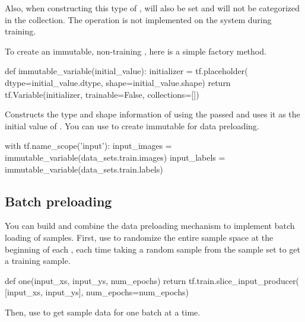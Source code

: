 \begin{content}
Also, when constructing this type of ,  will also be set and will not be categorized in the  collection. The  operation is not implemented on the system during training.

To create an immutable, non-training , here is a simple factory method.

\begin{leftbar}
\begin{python}
def immutable_variable(initial_value):
  initializer = tf.placeholder(
    dtype=initial_value.dtype,
    shape=initial_value.shape)
  return tf.Variable(initializer, trainable=False, collections=[])
\end{python}
\end{leftbar}

 Constructs the type and shape information of  using the passed  and uses it as the initial value of . You can use  to create immutable  for data preloading.

\begin{leftbar}
\begin{python}
with tf.name_scope('input'):
  input_images = immutable_variable(data_sets.train.images)
  input_labels = immutable_variable(data_sets.train.labels)
\end{python}
\end{leftbar}


\subsection{Batch preloading}
You can build  and combine the data preloading mechanism to implement batch loading of samples. First, use  to randomize the entire sample space at the beginning of each , each time taking a random sample from the sample set to get a training sample.

\begin{leftbar}
\begin{python}
def one(input_xs, input_ys, num_epochs)
  return tf.train.slice_input_producer(
    [input_xs, input_ys], num_epochs=num_epochs)
\end{python}
\end{leftbar}

Then, use  to get sample data for one batch at a time.


\end{content}
